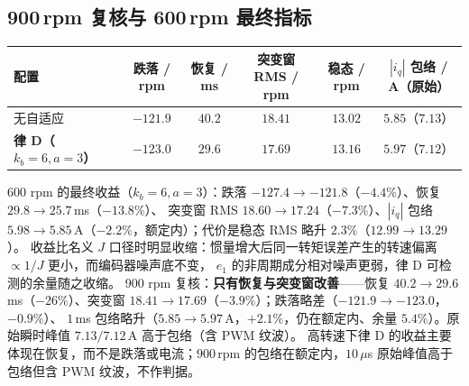 \documentclass[11pt,a4paper]{article}
\theoremstyle{remark}\newtheorem{remark}{注}
\begin{document}
\subsection{900\,rpm 复核与 600\,rpm 最终指标}\label{sec:lawd-900}
\begin{center}\footnotesize
\begin{tabular}{@{}lccccc@{}}
\toprule
配置 & 跌落 / rpm & 恢复 / ms & 突变窗 RMS / rpm & 稳态 / rpm & $|i_q|$ 包络 / A（原始）\\
\midrule
无自适应 & $-121.9$ & $40.2$ & $18.41$ & $13.02$ & $5.85$（$7.13$）\\
\textbf{律 D（$k_b=6,a=3$）} & $-123.0$ & $\mathbf{29.6}$ & $\mathbf{17.69}$ & $13.16$ & $5.97$（$7.12$）\\
\bottomrule
\end{tabular}
\end{center}
600 rpm 的最终收益（$k_b=6,a=3$）：跌落 $-127.4\to-121.8$（$-4.4\%$）、恢复 $29.8\to25.7$\,ms（$-13.8\%$）、
突变窗 RMS $18.60\to17.24$（$\mathbf{-7.3\%}$）、$|i_q|$ 包络 $5.98\to5.85$\,A（$-2.2\%$，额定内）；代价是稳态 RMS 略升 $2.3\%$（$12.99\to13.29$）。
收益比名义 $J$ 口径时明显收缩：惯量增大后同一转矩误差产生的转速偏离 $\propto1/J$ 更小，而编码器噪声底不变，
$e_1$ 的非周期成分相对噪声更弱，律 D 可检测的余量随之收缩。
900 rpm 复核：\textbf{只有恢复与突变窗改善}——恢复 $40.2\to29.6$\,ms（$-26\%$）、突变窗 $18.41\to17.69$（$-3.9\%$）；跌落略差（$-121.9\to-123.0$，$-0.9\%$）、
$1$\,ms 包络略升（$5.85\to5.97$\,A，$+2.1\%$，仍在额定内、余量 $5.4\%$）。原始瞬时峰值 $7.13/7.12$\,A 高于包络（含 PWM 纹波）。
高转速下律 D 的收益主要体现在恢复，而不是跌落或电流；$900$\,rpm 的包络在额定内，$10$\,$\mu$s 原始峰值高于包络但含 PWM 纹波，不作判据。
\end{document}
